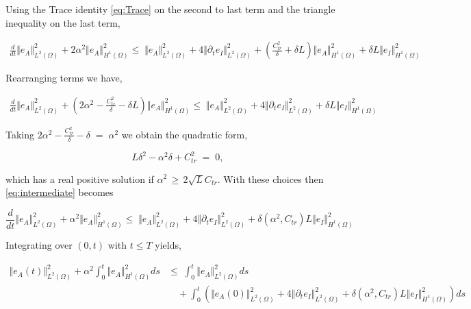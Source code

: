 \documentclass[10pt]{report}
\numberwithin{equation}{section}
\begin{document}
Using the Trace identity \eqref{eq:Trace} on the second to last term and the triangle inequality on the last term,

\begin{align}
\frac{d}{dt} \Vert e_{A} \Vert^{2}_{L^{2}(\Omega)}  +  2\alpha^{2} \Vert e_{A} \Vert_{H^{1}(\Omega)}^{2}  \leq \; \Vert  e_{A} \Vert_{L^{2}(\Omega)}^{2} + 4 \Vert \partial_{t} e_{I} \Vert^{2}_{L^{2}(\Omega)} + \left(\frac{C_{tr}^{2}}{\delta} + \delta L \right) \Vert  e_{A} \Vert_{H^{1}(\Omega)}^{2} + \delta L \Vert e_{I} \Vert_{H^{1}(\Omega)}^{2}
\end{align} 



Rearranging terms we have,


\begin{align}
\frac{d}{dt} \Vert e_{A} \Vert^{2}_{L^{2}(\Omega)}  +  \left(2\alpha^{2} - \frac{C_{tr}^{2}}{\delta} - \delta L \right) \Vert e_{A} \Vert_{H^{1}(\Omega)}^{2}  \leq \; \Vert  e_{A} \Vert_{L^{2}(\Omega)}^{2} + 4 \Vert \partial_{t} e_{I} \Vert^{2}_{L^{2}(\Omega)} + \delta L \Vert e_{I} \Vert_{H^{1}(\Omega)}^{2} \label{eq:intermediate}
\end{align} 


Taking $ 2\alpha^{2} - \frac{C_{tr}^{2}}{\delta} - \delta \; = \; \alpha^{2}$ we obtain the quadratic form,


\begin{equation}
L \delta^{2} - \alpha^{2} \delta + C_{tr}^{2} \; = \; 0,
\end{equation}


which has a real positive solution if $\alpha^{2} \, \geq \, 2 \sqrt{L} C_{tr}$.  With these choices then \eqref{eq:intermediate} becomes


\begin{equation}
\frac{d}{dt} \Vert e_{A} \Vert^{2}_{L^{2}(\Omega)}  +  \alpha^{2}  \Vert e_{A} \Vert_{H^{1}(\Omega)}^{2}  \leq \; \Vert  e_{A} \Vert_{L^{2}(\Omega)}^{2} + 4 \Vert \partial_{t} e_{I} \Vert^{2}_{L^{2}(\Omega)} + \delta \left( \alpha^{2}, C_{tr} \right) L \Vert e_{I} \Vert_{H^{1}(\Omega)}^{2} 
\end{equation}


Integrating over $(0,t)$ with $t \leq T$ yields,

\begin{align}
\Vert e_{A}(t) \Vert^{2}_{L^{2}(\Omega)}  + \alpha^{2} \int_{0}^{t}   \Vert e_{A} \Vert_{H^{1}(\Omega)}^{2} ds  &\leq \; \int_{0}^{t}  \Vert  e_{A} \Vert_{L^{2}(\Omega)}^{2} ds \\ 
 & \quad + \int_{0}^{t} \left( \Vert e_{A}(0) \Vert^{2}_{L^{2}(\Omega)} + 4 \Vert \partial_{t} e_{I} \Vert^{2}_{L^{2}(\Omega)} + \delta \left( \alpha^{2}, C_{tr} \right) L \Vert e_{I} \Vert_{H^{1}(\Omega)}^{2}  \right) ds 
\end{align}
\end{document}
